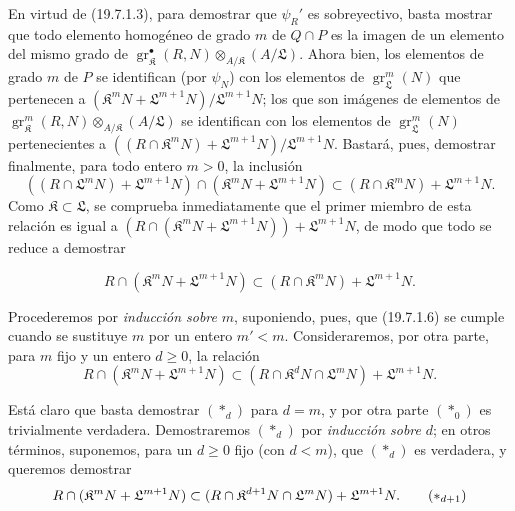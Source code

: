 \begin{env}[19.7.1.5]
\label{IV.19.7.1.5}
En virtud de (19.7.1.3), para demostrar que $\psi_R'$ es sobreyectivo, basta mostrar que todo elemento homogéneo de grado $m$ de $Q\cap P$ es la imagen de un elemento del mismo grado de $\operatorname{gr}_{\mathfrak K}^\bullet(R,N)\otimes_{A/\mathfrak K}(A/\mathfrak L)$. Ahora bien, los elementos de grado $m$ de $P$ se identifican (por $\psi_N$) con los elementos de $\operatorname{gr}_{\mathfrak L}^m(N)$ que pertenecen a $(\mathfrak K^mN+\mathfrak L^{m+1}N)/\mathfrak L^{m+1}N$; los que son imágenes de elementos de $\operatorname{gr}_{\mathfrak K}^m(R,N)\otimes_{A/\mathfrak K}(A/\mathfrak L)$ se identifican con los elementos de $\operatorname{gr}_{\mathfrak L}^m(N)$ pertenecientes a $((R\cap\mathfrak K^mN)+\mathfrak L^{m+1}N)/\mathfrak L^{m+1}N$. Bastará, pues, demostrar finalmente, para todo entero $m>0$, la inclusión
\[
  ((R\cap\mathfrak L^mN)+\mathfrak L^{m+1}N)\cap(\mathfrak K^mN+\mathfrak L^{m+1}N)\subset(R\cap\mathfrak K^mN)+\mathfrak L^{m+1}N.
\]
Como $\mathfrak K\subset\mathfrak L$, se comprueba inmediatamente que el primer miembro de esta relación es igual a $(R\cap(\mathfrak K^mN+\mathfrak L^{m+1}N))+\mathfrak L^{m+1}N$, de modo que todo se reduce a demostrar
\end{env}

\begin{env}[19.7.1.6]
\label{IV.19.7.1.6}
\[
  R\cap(\mathfrak K^mN+\mathfrak L^{m+1}N)\subset(R\cap\mathfrak K^mN)+\mathfrak L^{m+1}N.
\]
\end{env}


Procederemos por \emph{inducción sobre} $m$, suponiendo, pues, que (19.7.1.6) se cumple cuando se sustituye $m$ por un entero $m'<m$. Consideraremos, por otra parte, para $m$ fijo y un entero $d\geq0$, la relación
\begin{equation}
  R\cap(\mathfrak K^mN+\mathfrak L^{m+1}N)\subset(R\cap\mathfrak K^dN\cap\mathfrak L^mN)+\mathfrak L^{m+1}N.
  \tag{$*_d$}
\end{equation}

Está claro que basta demostrar $(*_d)$ para $d=m$, y por otra parte $(*_0)$ es trivialmente verdadera. Demostraremos $(*_d)$ por \emph{inducción sobre} $d$; en otros términos, suponemos, para un $d\geq0$ fijo (con $d<m$), que $(*_d)$ es verdadera, y queremos demostrar
\begin{equation}
  R\cap(\mathfrak K^mN+\mathfrak L^{m+1}N)\subset(R\cap\mathfrak K^{d+1}N\cap\mathfrak L^mN)+\mathfrak L^{m+1}N.
  \tag{$*_{d+1}$}
\end{equation}

